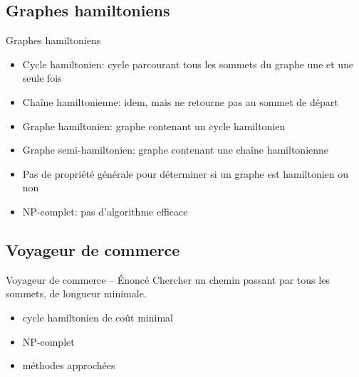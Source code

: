 \documentclass{beamer}
\begin{document}
\subsection{Graphes hamiltoniens}
\begin{frame}{Graphes hamiltoniens}
  \begin{itemize}
    \item Cycle hamiltonien: cycle parcourant tous les sommets du graphe une et une seule fois
    \item Chaîne hamiltonienne: idem, mais ne retourne pas au sommet de départ
    \item Graphe hamiltonien: graphe contenant un cycle hamiltonien
    \item Graphe semi-hamiltonien: graphe contenant une chaîne hamiltonienne 
    \item Pas de propriété générale pour déterminer si un graphe est hamiltonien ou non 
    \item NP-complet: pas d'algorithme efficace
  \end{itemize}
\end{frame}

\subsection{Voyageur de commerce}
\begin{frame}{Voyageur de commerce -- Énoncé}
    Chercher un chemin passant par tous les sommets, de longueur minimale.
    \begin{itemize}
        \item cycle hamiltonien de coût minimal
        \item NP-complet
        \item méthodes approchées
    \end{itemize}
\end{frame}
\end{document}
